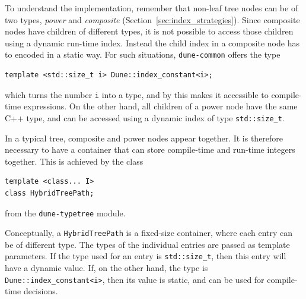 \documentclass[a4paper,10pt,headings=normal,bibliography=totoc]{scrartcl}
\newcommand{\cpp}[1]{\lstinline[basicstyle=\ttfamily]!#1!}
\newcommand{\dunemodule}[1]{\texttt{#1}}
\begin{document}
To understand the implementation,
remember that non-leaf tree nodes can be of two types, \emph{power} and
\emph{composite} (Section~\ref{sec:index_strategies}).
Since composite nodes have children of different
types, it is not possible to access those children using a dynamic run-time
index. Instead the child index in a composite node has to encoded in a static
way.  For such situations, \dunemodule{dune-common} offers the type
\begin{lstlisting}[style=Interface]
template <std::size_t i> Dune::index_constant<i>;
\end{lstlisting}
which turns the number \cpp{i} into a type, and by this makes it accessible
to compile-time expressions.
On the other hand, all children of a power node have
the same C++ type, and can be accessed using a dynamic index of type \cpp{std::size_t}.

In a typical tree, composite and power nodes appear together.  It is therefore
necessary to have a container that can store compile-time and run-time integers
together.  This is achieved by the class
%
\begin{lstlisting}[style=Interface]
template <class... I>
class HybridTreePath;
\end{lstlisting}
%
from the \dunemodule{dune-typetree} module.

Conceptually, a \cpp{HybridTreePath} is a fixed-size container, where each entry
can be of different type. The types of the individual entries
are passed as template parameters. If the type used for an entry is
\cpp{std::size_t}, then this entry will have a dynamic value.
If, on the other hand, the type is \cpp{Dune::index_constant<i>}, then its value is static,
and can be used for compile-time decisions.
\end{document}
